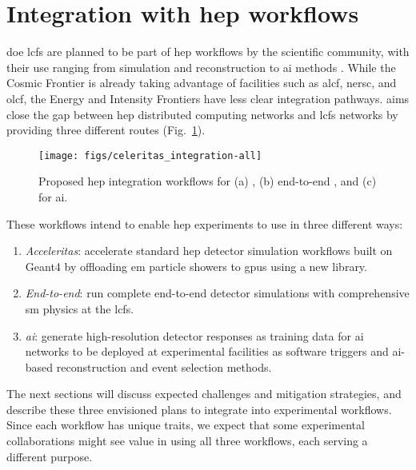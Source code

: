 \section{Integration with \ac{hep} workflows}

\ac{doe} \acp{lcf} are planned to be part of \ac{hep} workflows by the
scientific community, with their use ranging from simulation and reconstruction
to \ac{ai} methods \cite{hep-network-requirements}. While the Cosmic Frontier is
already taking advantage of facilities such as \ac{alcf}, \ac{nersc}, and
\ac{olcf}, the Energy and Intensity Frontiers have less clear integration
pathways. \celeritas aims close the gap between \ac{hep} distributed computing
networks and \acp{lcf} networks by providing three different routes
(Fig.~\ref{fig:celeritas-hep-workflows}).
\begin{figure}
    \centering
    \texttt{[image: figs/celeritas\_integration-all]}
    \caption{Proposed \acs{hep} integration workflows for (a) \acceleritas, (b)
    end-to-end \celeritas, and (c) \celeritas for \acs{ai}.}
    \label{fig:celeritas-hep-workflows}
\end{figure}
These workflows intend to enable \ac{hep} experiments to use \celeritas in three
different ways:
\begin{enumerate}[itemsep=0pt, label=(\alph*)]
  \item \emph{Acceleritas}: accelerate standard \ac{hep} detector simulation
    workflows built on Geant4 by offloading \ac{em} particle showers to
    \acp{gpu} using a new \acceleritas library.
  \item \emph{End-to-end}: run complete end-to-end detector simulations with
    comprehensive \ac{sm} physics at the \acp{lcf}.
  \item \emph{\ac{ai}}: generate high-resolution detector responses as training
    data for \ac{ai} networks to be deployed at experimental facilities as
    software triggers and \ac{ai}-based reconstruction and event selection
    methods.
\end{enumerate}
The next sections will discuss expected challenges and mitigation strategies,
and describe these three envisioned plans to integrate \celeritas into
experimental workflows. Since each workflow has unique traits, we expect that
some experimental collaborations might see value in using all three workflows,
each serving a different purpose.

